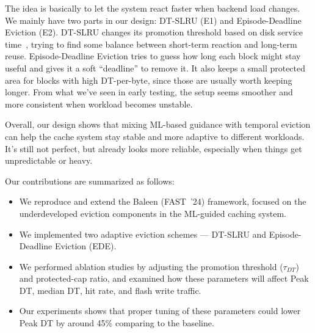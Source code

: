 The idea is basically to let the system react faster when backend load changes. We mainly have two parts in our design: DT-SLRU (E1) and Episode-Deadline Eviction (E2). DT-SLRU changes its promotion threshold based on disk service time~\cite{beckmann2018lhd}, trying to find some balance between short-term reaction and long-term reuse. Episode-Deadline Eviction tries to guess how long each block might stay useful and gives it a soft “deadline” to remove it. It also keeps a small protected area for blocks with high DT-per-byte, since those are usually worth keeping longer. From what we’ve seen in early testing, the setup seems smoother and more consistent when workload becomes unstable.

Overall, our design shows that mixing ML-based guidance with temporal eviction can help the cache system stay stable and more adaptive to different workloads. It’s still not perfect, but already looks more reliable, especially when things get unpredictable or heavy.

Our contributions are summarized as follows:
\begin{itemize}[topsep=0pt, parsep=0pt, itemsep=0pt, leftmargin=*]
    \item We reproduce and extend the Baleen (FAST~'24) framework, focused on the underdeveloped eviction components in the ML-guided caching system.
    \item We implemented two adaptive eviction schemes --- DT-SLRU and Episode-Deadline Eviction (EDE).
    \item We performed ablation studies by adjusting the promotion threshold ($\tau_{DT}$) and protected-cap ratio, and examined how these parameters will affect Peak DT, median DT, hit rate, and flash write traffic.
    \item Our experiments shows that proper tuning of these parameters could lower Peak DT by around 45\% comparing to the baseline.
\end{itemize}
